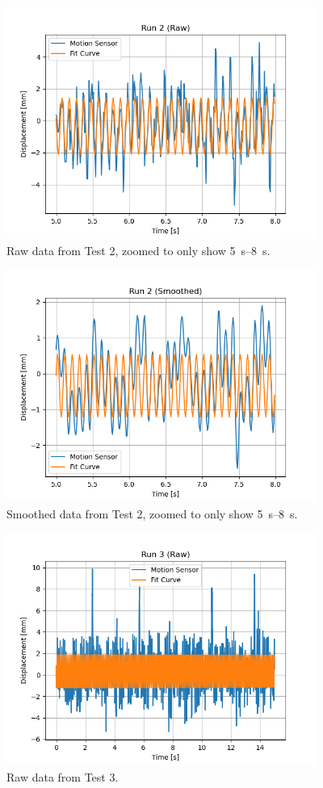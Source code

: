 \documentclass[12 pt]{report}
\begin{document}
\begin{figure}[htbp]
\centering
\includegraphics[width=4in]{images/Graphs/Run_2-Raw-Zoomed}
\caption{Raw data from Test \num{2}, zoomed to only show \qtyrange{5}{8}{\s}.}
\end{figure}

\begin{figure}[htbp]
\centering
\includegraphics[width=4in]{images/Graphs/Run_2-Smoothed-Zoomed}
\caption{Smoothed data from Test \num{2}, zoomed to only show \qtyrange{5}{8}{\s}.}
\end{figure}


\begin{figure}[htbp]
\centering
\includegraphics[width=4in]{images/Graphs/Run_3-Raw}
\caption{Raw data from Test \num{3}.}
\end{figure}
\end{document}
